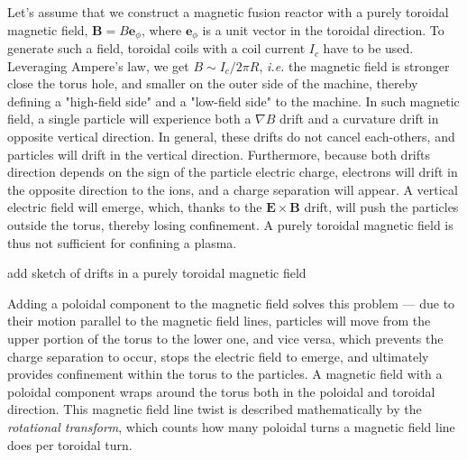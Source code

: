 \documentclass[my_thesis.tex]{subfiles}
\begin{document}
Let's assume that we construct a magnetic fusion reactor with a purely toroidal magnetic field, $\mathbf{B}= B\mathbf{e}_\phi$, where $\mathbf{e}_\phi$ is a unit vector in the toroidal direction. To generate such a field, toroidal coils with a coil current $I_c$ have to be used. Leveraging Ampere's law, we get $B \sim I_c / 2\pi R$, \textit{i.e.} the magnetic field is stronger close the torus hole, and smaller on the outer side of the machine, thereby defining a "high-field side" and a "low-field side" to the machine. In such magnetic field, a single particle will experience both a $\nabla B$ drift and a curvature drift in opposite vertical direction. In general, these drifts do not cancel each-others, and particles will drift in the vertical direction. Furthermore, because both drifts direction depends on the sign of the particle electric charge, electrons will drift in the opposite direction to the ions, and a charge separation will appear. A vertical electric field will emerge, which, thanks to the $\mathbf{E}\times\mathbf{B}$ drift, will push the particles outside the torus, thereby losing confinement. A purely toroidal magnetic field is thus not sufficient for confining a plasma.

{\color{red} add sketch of drifts in a purely toroidal magnetic field}

Adding a poloidal component to the magnetic field solves this problem --- due to their motion parallel to the magnetic field lines, particles will move from the upper portion of the torus to the lower one, and vice versa, which prevents the charge separation to occur, stops the electric field to emerge, and ultimately provides confinement within the torus to the particles. A magnetic field with a poloidal component wraps around the torus both in the poloidal and toroidal direction. This magnetic field line twist is described mathematically by the \emph{rotational transform}, which counts how many poloidal turns a magnetic field line does per toroidal turn. 
\end{document}
